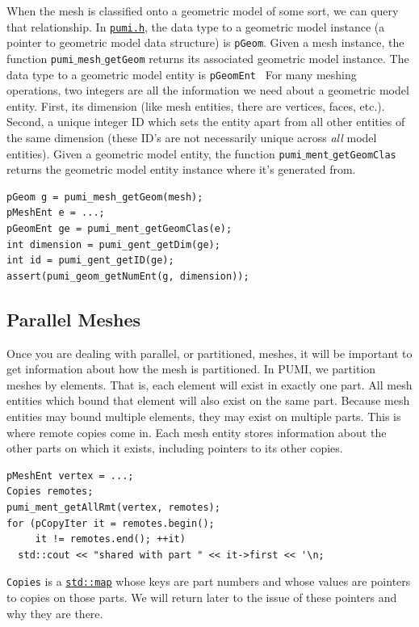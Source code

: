 \documentclass{article}
\begin{document}
{When the mesh is classified onto a geometric model of some sort, we
can query that relationship. In \href{https://github.com/SCOREC/core/blob/master/pumi/pumi.h}{\texttt{pumi.h}}, the data type to a geometric model instance (a pointer to geometric model data structure) is \texttt{pGeom}. Given a mesh instance, the function \texttt{pumi$\_$mesh$\_$getGeom} returns its associated geometric model instance. The data type to a geometric model entity is {\texttt{pGeomEnt}}
\
For many meshing operations, two integers are all the information
we need about a geometric model entity.
First, its dimension (like mesh entities, there are vertices, faces, etc.).
Second, a unique integer ID which sets the entity apart from
all other entities of the same dimension (these ID's are not necessarily
unique across \emph{all} model entities).
Given a geometric model entity, the function \texttt{pumi$\_$ment$\_$getGeomClas} returns the geometric model entity instance where it's generated from.

\begin{lstlisting}
pGeom g = pumi_mesh_getGeom(mesh);
pMeshEnt e = ...;
pGeomEnt ge = pumi_ment_getGeomClas(e);
int dimension = pumi_gent_getDim(ge);
int id = pumi_gent_getID(ge);
assert(pumi_geom_getNumEnt(g, dimension));
\end{lstlisting}

\subsection{Parallel Meshes}

Once you are dealing with parallel, or partitioned, meshes,
it will be important to get information about how the
mesh is partitioned.
In PUMI, we partition meshes by elements.
That is, each element will exist in exactly one part.
All mesh entities which bound that element will also exist on
the same part.
Because mesh entities may bound multiple elements, they may
exist on multiple parts.
This is where remote copies come in.
Each mesh entity stores information about the other parts
on which it exists, including pointers to its other copies.

\begin{lstlisting}
pMeshEnt vertex = ...;
Copies remotes;
pumi_ment_getAllRmt(vertex, remotes);
for (pCopyIter it = remotes.begin();
     it != remotes.end(); ++it)
  std::cout << "shared with part " << it->first << '\n;
\end{lstlisting}

\texttt{Copies} is a
\href{http://www.cplusplus.com/reference/map/map/}{\texttt{std::map}}
whose keys are part numbers and whose
values are pointers to copies on those parts.
We will return later to the issue of these pointers and
why they are there.

}
\end{document}
